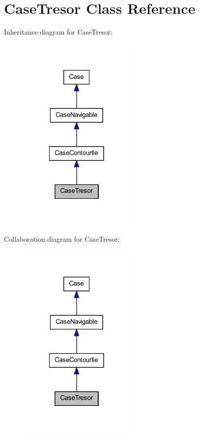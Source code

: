 \hypertarget{class_case_tresor}{
\section{CaseTresor Class Reference}
\label{class_case_tresor}
}


Inheritance diagram for CaseTresor:
\nopagebreak
\begin{figure}[H]
\begin{center}
\leavevmode
\includegraphics[width=162pt]{class_case_tresor__inherit__graph}
\end{center}
\end{figure}


Collaboration diagram for CaseTresor:
\nopagebreak
\begin{figure}[H]
\begin{center}
\leavevmode
\includegraphics[width=162pt]{class_case_tresor__coll__graph}
\end{center}
\end{figure}
